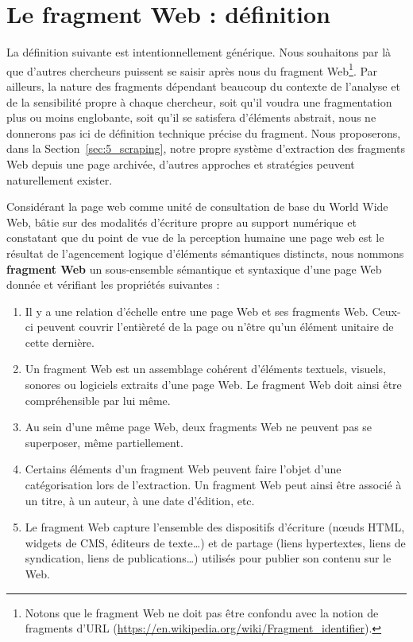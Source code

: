 \documentclass[symmetric,justified,marginals=raggedouter]{tufte-book}
\begin{document}
\section{Le fragment Web : définition}
\label{sec:5_fragment}

\noindent La définition suivante est intentionnellement générique. Nous souhai\-tons par là que d'autres chercheurs puissent se saisir après nous du fragment Web\footnote{\RaggedOuter Notons que le fragment Web ne doit pas être confondu avec la notion de fragments d'URL (\url{https://en.wikipedia.org/wiki/Fragment_identifier}).}. Par ailleurs, la nature des fragments dépendant beaucoup du contexte de l'analyse et de la sensibilité propre à chaque chercheur, soit qu'il voudra une fragmentation plus ou moins englobante, soit qu'il se satisfera d'éléments abstrait, nous ne donnerons pas ici de définition technique précise du fragment. Nous proposerons, dans la Section~\ref{sec:5_scraping}, notre propre système d'extraction des fragments Web depuis une page archivée, d'autres approches et stratégies peuvent naturellement exister.\\

\begin{itshape}
\noindent Considérant la page web comme unité de consultation de base du World Wide Web, bâtie sur des modalités d'écriture propre au support numérique et constatant que du point de vue de la perception humaine \citep{bernard_criteria_2003, michailidou_visual_2008} une page web est le résultat de l'agencement logique d'éléments sémantiques distincts, nous nommons \textbf{fragment Web} un sous-ensemble sémantique et syntaxique d'une page Web donnée et vérifiant les propriétés suivantes :

\begin{enumerate}[leftmargin=*]  
\item Il y a une relation d'échelle entre une page Web et ses fragments Web. Ceux-ci peuvent couvrir l'entièreté de la page ou n'être qu'un élément unitaire de cette dernière.
\item Un fragment Web est un assemblage cohérent d'éléments textuels, visuels, sonores ou logiciels extraits d'une page Web. Le fragment Web doit ainsi être compréhensible par lui même.
\item Au sein d'une même page Web, deux fragments Web ne peuvent pas se superposer, même partiellement.
\item Certains éléments d'un fragment Web peuvent faire l'objet d'une catégorisation lors de l'extraction. Un fragment Web peut ainsi être associé à un titre, à un auteur, à une date d'édition, etc.
\item Le fragment Web capture l'ensemble des dispositifs d'écriture (nœuds HTML, widgets de CMS, éditeurs de texte\ldots{}) et de partage (liens hypertextes, liens de syndication, liens de publications\ldots{}) utilisés pour publier son contenu sur le Web.
\end{enumerate}
\end{itshape}
\end{document}
